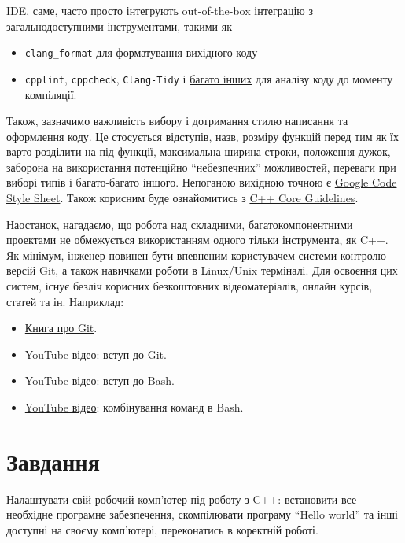 \documentclass[12pt]{article}
\begin{document}
	IDE, саме, часто просто інтегрують out-of-the-box інтеграцію з загальнодоступними інструментами, такими як
	\begin{itemize}
		\item \texttt{clang\_format} для форматування вихідного коду
		\item \texttt{cpplint}, \texttt{cppcheck}, \texttt{Clang-Tidy} і \href{https://en.wikipedia.org/wiki/List_of_tools_for_static_code_analysis#C,_C++}{багато інших} для аналізу коду до моменту компіляції.
	\end{itemize}

	Також, зазначимо важливість вибору і дотримання стилю написання та оформлення коду. Це стосується відступів, назв, розміру функцій перед тим як їх варто розділити на під-функції, максимальна ширина строки, положення дужок, заборона на використання потенційно ``небезпечних'' можливостей, переваги при виборі типів і багато-багато іншого. Непоганою вихідною точною є \href{https://google.github.io/styleguide/cppguide.html}{Google Code Style Sheet}. Також корисним буде ознайомитись з \href{https://github.com/isocpp/CppCoreGuidelines}{C++ Core Guidelines}.

	Наостанок, нагадаємо, що робота над складними, багатокомпонентними проектами не обмежується використанням одного тільки інструмента, як C++. Як мінімум, інженер повинен бути впевненим користувачем системи контролю версій Git, а також навичками роботи в Linux/Unix терміналі. Для освоєння цих систем, існує безліч корисних безкоштовних відеоматеріалів, онлайн курсів, статей та ін. Наприклад:
	\begin{itemize}
		\item \href{https://git-scm.com/book/en/v2}{Книга про Git}.
		\item \href{https://www.youtube.com/watch?v=hwP7WQkmECE}{YouTube відео}: вступ до Git.
		\item \href{https://www.youtube.com/watch?v=oxuRxtrO2Ag}{YouTube відео}: вступ до Bash.
		\item \href{https://www.youtube.com/watch?v=mV_8GbzwZMM}{YouTube відео}: комбінування команд в Bash.
	\end{itemize}

	\section*{Завдання}
	
	Налаштувати свій робочий комп'ютер під роботу з C++: встановити все необхідне програмне забезпечення, скомпілювати програму ``Hello world'' та інші доступні на своєму комп'ютері, переконатись в коректній роботі.
\end{document}
